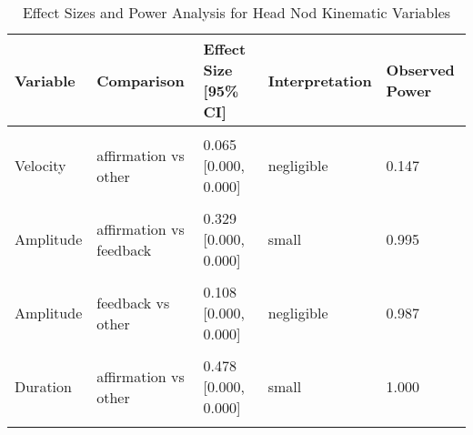 \begin{table}[!h]
\centering
\caption{Effect Sizes and Power Analysis for Head Nod Kinematic Variables}
\centering
\begin{tabular}[t]{lllll}
\toprule
Variable & Comparison & Effect Size [95\% CI] & Interpretation & Observed Power\\
\midrule
\cellcolor{gray!10}{Velocity} & \cellcolor{gray!10}{affirmation vs feedback} & \cellcolor{gray!10}{0.420 [0.000, 0.000]} & \cellcolor{gray!10}{small} & \cellcolor{gray!10}{1.000}\\
Velocity & affirmation vs other & 0.065 [0.000, 0.000] & negligible & 0.147\\
\cellcolor{gray!10}{Velocity} & \cellcolor{gray!10}{feedback vs other} & \cellcolor{gray!10}{-0.312 [0.000, 0.000]} & \cellcolor{gray!10}{small} & \cellcolor{gray!10}{1.000}\\
Amplitude & affirmation vs feedback & 0.329 [0.000, 0.000] & small & 0.995\\
\cellcolor{gray!10}{Amplitude} & \cellcolor{gray!10}{affirmation vs other} & \cellcolor{gray!10}{0.488 [0.000, 0.000]} & \cellcolor{gray!10}{small} & \cellcolor{gray!10}{1.000}\\
\addlinespace
Amplitude & feedback vs other & 0.108 [0.000, 0.000] & negligible & 0.987\\
\cellcolor{gray!10}{Duration} & \cellcolor{gray!10}{affirmation vs feedback} & \cellcolor{gray!10}{-0.221 [0.000, 0.000]} & \cellcolor{gray!10}{small} & \cellcolor{gray!10}{0.866}\\
Duration & affirmation vs other & 0.478 [0.000, 0.000] & small & 1.000\\
\cellcolor{gray!10}{Duration} & \cellcolor{gray!10}{feedback vs other} & \cellcolor{gray!10}{0.605 [0.000, 0.000]} & \cellcolor{gray!10}{medium} & \cellcolor{gray!10}{1.000}\\
\bottomrule
\end{tabular}
\end{table}
